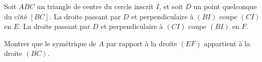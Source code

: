 Soit $ABC$ un triangle de centre du cercle inscrit $I$, et soit $D$ un point quelconque du côté $[BC]$. La droite passant par $D$ et perpendiculaire à $(BI)$ coupe $(CI)$ en $E$. La droite passant par $D$ et perpendiculaire à $(CI)$ coupe $(BI)$ en $F$.

Montrer que le symétrique de $A$ par rapport à la droite $(EF)$ appartient à la droite $(BC)$.
